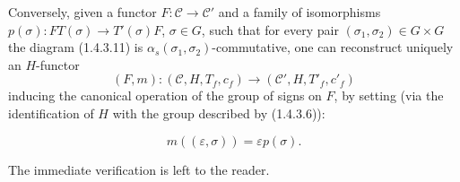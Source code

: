Conversely, given a functor $F\colon\mathcal C\to\mathcal C'$ and a
family of isomorphisms
$p(\sigma)\colon FT(\sigma)\to T'(\sigma)F$, $\sigma\in G$, such that
for every pair $(\sigma_1,\sigma_2)\in G\times G$ the diagram
(1.4.3.11) is $\alpha_s(\sigma_1,\sigma_2)$-commutative, one can
reconstruct uniquely an $H$-functor
\[
  (F,m)\colon(\mathcal C,H,T_f,c_f)
  \longrightarrow(\mathcal C',H,T'_f,c'_f)
\]
inducing the canonical operation of the group of signs on $F$, by
setting (via the identification of $H$ with the group described by
(1.4.3.6)):

\begin{equation}
  m((\varepsilon,\sigma))=\varepsilon p(\sigma).
  \tag{1.4.3.12}
\end{equation}

The immediate verification is left to the reader.
